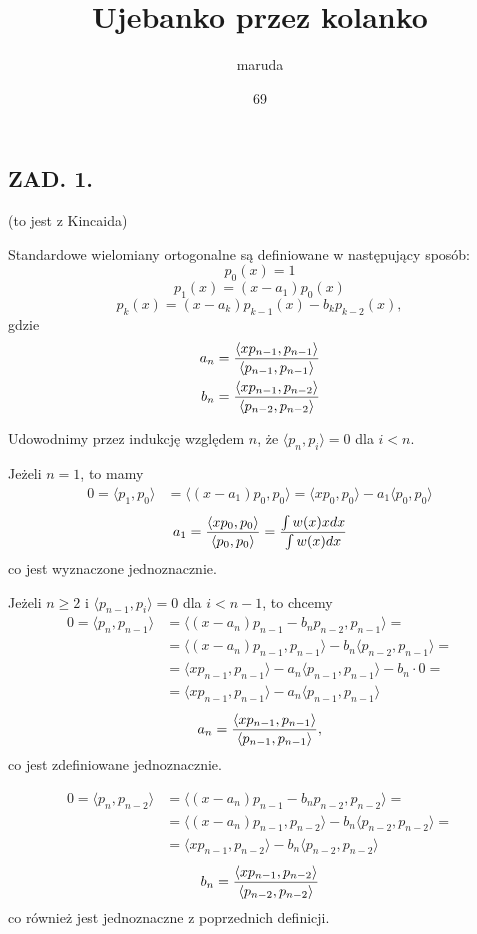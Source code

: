 \documentclass{article}[16pt]
\title{Ujebanko przez kolanko}
\date{69}
\author{maruda}
\begin{document}
\maketitle

\subsection*{ZAD. 1.}

(to jest z Kincaida)
\smallskip

Standardowe wielomiany ortogonalne są definiowane w następujący sposób:
$$p_0(x)=1$$
$$p_1(x)=(x-a_1)p_0(x)$$
$$p_k(x)=(x-a_k)p_{k-1}(x)-b_kp_{k-2}(x),$$
gdzie
\begin{align*}
    a_n&={\langle xp_{n-1},p_{n-1}\rangle\over\langle p_{n-1},p_{n-1}\rangle}\\
    b_n&={\langle xp_{n-1},p_{n-2}\rangle\over\langle p_{n-2},p_{n-2}\rangle}
\end{align*}

Udowodnimy przez indukcję względem $n$, że $\langle p_n,p_i\rangle=0$ dla $i<n$.

Jeżeli $n=1$, to mamy
\begin{align*}
    0=\langle p_1, p_0\rangle &= \langle (x-a_1)p_0, p_0\rangle=\langle xp_0,p_0\rangle-a_1\langle p_0,p_0\rangle
\end{align*}
$$a_1={\langle xp_0,p_0\rangle\over \langle p_0,p_0\rangle}={\int w(x)xdx\over \int w(x)dx}$$
co jest wyznaczone jednoznacznie.

Jeżeli $n\geq 2$ i $\langle p_{n-1},p_i\rangle=0$ dla $i<n-1$, to chcemy
\begin{align*}
    0=\langle p_n,p_{n-1}\rangle&=\langle (x-a_n)p_{n-1}-b_np_{n-2},p_{n-1}\rangle=\\
    &=\langle (x-a_n)p_{n-1},p_{n-1}\rangle-b_n\langle p_{n-2},p_{n-1}\rangle=\\
    &=\langle xp_{n-1},p_{n-1}\rangle-a_n\langle p_{n-1},p_{n-1}\rangle -b_n\cdot 0=\\
    &=\langle xp_{n-1},p_{n-1}\rangle-a_n\langle p_{n-1},p_{n-1}\rangle
\end{align*}
$$a_n={\langle xp_{n-1},p_{n-1}\rangle\over \langle p_{n-1},p_{n-1}\rangle},$$
co jest zdefiniowane jednoznacznie.

\begin{align*}
    0=\langle p_n,p_{n-2}\rangle&=\langle (x-a_n)p_{n-1}-b_np_{n-2}, p_{n-2}\rangle=\\
    &=\langle (x-a_n)p_{n-1},p_{n-2}\rangle-b_n\langle p_{n-2},p_{n-2}\rangle=\\
    &=\langle xp_{n-1},p_{n-2}\rangle-b_n\langle p_{n-2},p_{n-2}\rangle
\end{align*}
$$b_n={\langle xp_{n-1},p_{n-2}\rangle\over \langle p_{n-2},p_{n-2}\rangle}$$
co również jest jednoznaczne z poprzednich definicji.
\medskip
\end{document}
